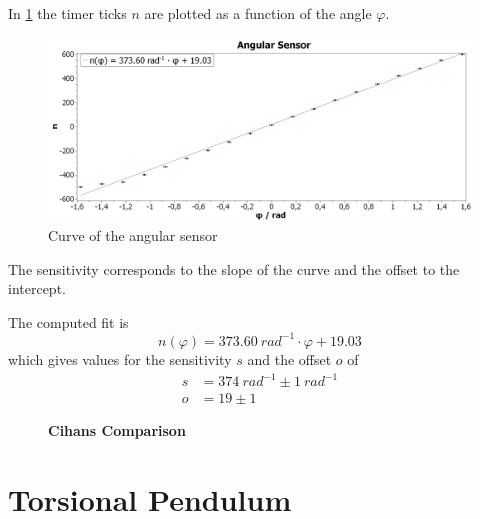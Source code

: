         In \cref{fig:angular-sensor} the timer ticks $ n $ are plotted as a function of the angle $ \varphi $.
        \begin{figure}[H]
            \centering
            \includegraphics[width=1\linewidth]{"messdaten/Angular Sensor"}
            \caption[Curve of the angular sensor]{Curve of the angular sensor}
            \label{fig:angular-sensor}
        \end{figure}
        The sensitivity corresponds to the slope of the curve and the offset to the intercept.\par
        The computed fit is
        \begin{equation}
            n(\varphi)=\SI{373.60}{rad^{-1}}\cdot\varphi +19.03
        \end{equation}
        which gives values for the sensitivity \( s \) and the offset \( o \) of
        \begin{align}
            s&=\SI{374}{rad^{-1}} \pm \SI{1}{rad^{-1}}\\
            o&=19 \pm 1
        \end{align}
        \begin{figure}
            \centering
            \begin{framed}
                \textbf{Cihans Comparison}
            \end{framed}
        \end{figure}

    \section{Torsional Pendulum}

